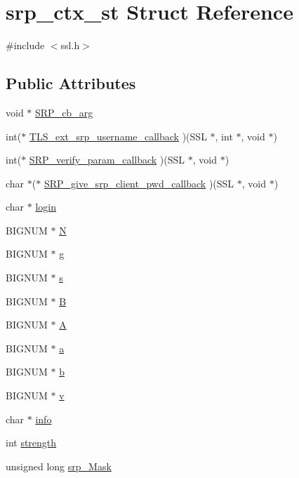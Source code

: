 \hypertarget{structsrp__ctx__st}{\section{srp\-\_\-ctx\-\_\-st Struct Reference}
\label{structsrp__ctx__st}
}


{\ttfamily \#include $<$ssl.\-h$>$}

\subsection*{Public Attributes}
\begin{DoxyCompactItemize}
\item 
void $\ast$ \hyperlink{structsrp__ctx__st_aa49970f50ded55c00d44e1601b40c9b1}{S\-R\-P\-\_\-cb\-\_\-arg}
\item 
int($\ast$ \hyperlink{structsrp__ctx__st_a5bf5815ad8a3bd9aa1c84782324286a9}{T\-L\-S\-\_\-ext\-\_\-srp\-\_\-username\-\_\-callback} )(S\-S\-L $\ast$, int $\ast$, void $\ast$)
\item 
int($\ast$ \hyperlink{structsrp__ctx__st_ae0c484c42a31b5706d95413b75065780}{S\-R\-P\-\_\-verify\-\_\-param\-\_\-callback} )(S\-S\-L $\ast$, void $\ast$)
\item 
char $\ast$($\ast$ \hyperlink{structsrp__ctx__st_aa5afa00b70e212481117beb4ab42eb97}{S\-R\-P\-\_\-give\-\_\-srp\-\_\-client\-\_\-pwd\-\_\-callback} )(S\-S\-L $\ast$, void $\ast$)
\item 
char $\ast$ \hyperlink{structsrp__ctx__st_a9406590abd27d1bfb79b3f76c27b9c29}{login}
\item 
B\-I\-G\-N\-U\-M $\ast$ \hyperlink{structsrp__ctx__st_a207fb6e32702e2be6e8477d3acb19ddc}{N}
\item 
B\-I\-G\-N\-U\-M $\ast$ \hyperlink{structsrp__ctx__st_a92c5d7f90a3fca1bbb24d6046ad69aa6}{g}
\item 
B\-I\-G\-N\-U\-M $\ast$ \hyperlink{structsrp__ctx__st_aeabfb75bde4e22d7f33fa49b2ad84c3b}{s}
\item 
B\-I\-G\-N\-U\-M $\ast$ \hyperlink{structsrp__ctx__st_a7849b7e0d38bddd6243e44f90bc8a48d}{B}
\item 
B\-I\-G\-N\-U\-M $\ast$ \hyperlink{structsrp__ctx__st_a65bcccab6ee5eb609c2304fd3a2a7c3f}{A}
\item 
B\-I\-G\-N\-U\-M $\ast$ \hyperlink{structsrp__ctx__st_a5d063ec2dc87cc7351ced5b25de67e3f}{a}
\item 
B\-I\-G\-N\-U\-M $\ast$ \hyperlink{structsrp__ctx__st_aee9feaedd4dd38b5532c35c3b8b366d5}{b}
\item 
B\-I\-G\-N\-U\-M $\ast$ \hyperlink{structsrp__ctx__st_a822ab1c65a312a2baefa2c5f35d48ab4}{v}
\item 
char $\ast$ \hyperlink{structsrp__ctx__st_a6ca9932a9bf584ced4514a641da677aa}{info}
\item 
int \hyperlink{structsrp__ctx__st_a7c4b3e2077d11a9ad4b45424bc098148}{strength}
\item 
unsigned long \hyperlink{structsrp__ctx__st_a64b3466f134d404daadf0abf37589097}{srp\-\_\-\-Mask}
\end{DoxyCompactItemize}


